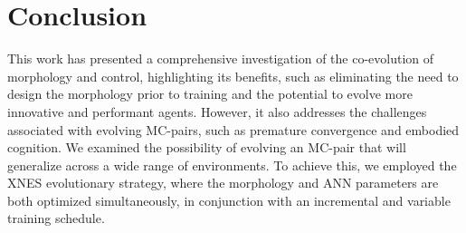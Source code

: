 \section{Conclusion}
    This work has presented a comprehensive investigation of the co-evolution of morphology and control, highlighting its benefits, such as eliminating the need to design the morphology prior to training and the potential to evolve more innovative and performant agents. However, it also addresses the challenges associated with evolving MC-pairs, such as premature convergence and embodied cognition. We examined the possibility of evolving an MC-pair that will generalize across a wide range of environments. To achieve this, we employed the XNES evolutionary strategy, where the morphology and ANN parameters are both optimized simultaneously, in conjunction with an incremental and variable training schedule.

    